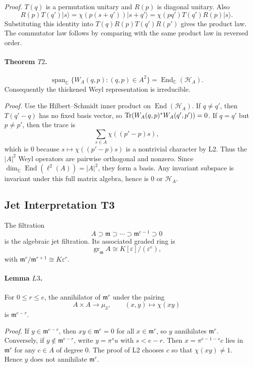 \emph{Proof.}
\(T(q)\) is a permutation unitary and \(R(p)\) is diagonal unitary.  Also
\[
  R(p)T(q')|s\rangle
  =
  \chi(p(s+q'))|s+q'\rangle
  =
  \chi(pq')T(q')R(p)|s\rangle .
\]
Substituting this identity into \(T(q)R(p)T(q')R(p')\) gives the product law.
The commutator law follows by comparing with the same product law in reversed
order.

\paragraph{Theorem \(T2\).}
\[
  \operatorname{span}_{\mathbb C}\{W_A(q,p):(q,p)\in A^2\}
  =
  \operatorname{End}_{\mathbb C}(\mathcal H_A).
\]
Consequently the thickened Weyl representation is irreducible.

\emph{Proof.}
Use the Hilbert--Schmidt inner product on \(\operatorname{End}(\mathcal H_A)\).  If
\(q\ne q'\), then \(T(q'-q)\) has no fixed basis vector, so
\(\operatorname{Tr}(W_A(q,p)^*W_A(q',p'))=0\).  If \(q=q'\) but \(p\ne p'\), then the trace
is
\[
  \sum_{s\in A}\chi((p'-p)s),
\]
which is \(0\) because \(s\mapsto\chi((p'-p)s)\) is a nontrivial character by
L2.  Thus the \(|A|^2\) Weyl operators are pairwise orthogonal and nonzero.
Since \(\dim_\mathbb C\operatorname{End}(\ell^2(A))=|A|^2\), they form a basis.  Any
invariant subspace is invariant under this full matrix algebra, hence is
\(0\) or \(\mathcal H_A\).

\subsection{Jet Interpretation T3}

The filtration
\[
  A\supset\mathfrak m\supset\cdots\supset\mathfrak m^{e-1}\supset0
\]
is the algebraic jet filtration.  Its associated graded ring is
\[
  \operatorname{gr}_{\mathfrak m}A
  \cong K[\varepsilon]/(\varepsilon^e),
\]
with \(\mathfrak m^r/\mathfrak m^{r+1}\cong K\varepsilon^r\).

\paragraph{Lemma \(L3\).}
For \(0\le r\le e\), the annihilator of \(\mathfrak m^r\) under the pairing
\[
  A\times A\longrightarrow\mu_3,\qquad (x,y)\longmapsto\chi(xy)
\]
is \(\mathfrak m^{e-r}\).

\emph{Proof.}
If \(y\in\mathfrak m^{e-r}\), then \(xy\in\mathfrak m^e=0\) for all
\(x\in\mathfrak m^r\), so \(y\) annihilates \(\mathfrak m^r\).  Conversely,
if \(y\notin\mathfrak m^{e-r}\), write \(y=\pi^s u\) with \(s<e-r\).  Then
\(x=\pi^{e-1-s}c\) lies in \(\mathfrak m^r\) for any \(c\in A\) of degree
\(0\).  The proof of L2 chooses \(c\) so that \(\chi(xy)\ne1\).  Hence \(y\)
does not annihilate \(\mathfrak m^r\).

